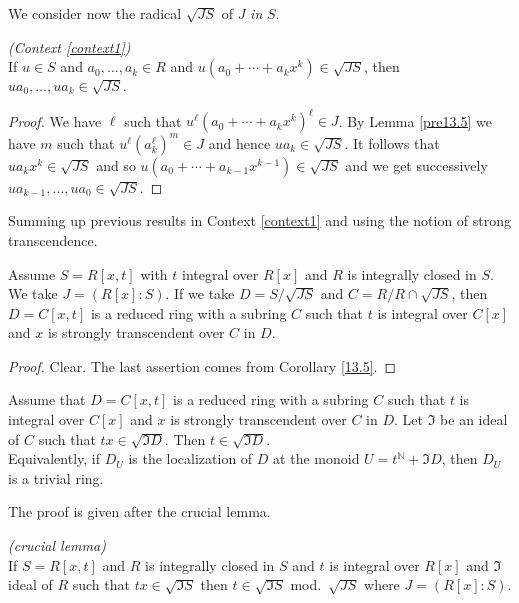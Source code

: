 \documentclass[11pt,a4paper,twoside]{article}
\newcommand{\gothic}{\mathfrak}
\newcommand{\fI}{{\gothic I}}
\begin{document}
 We consider now the radical $\sqrt {JS}$ of $J$ {\em in} $S$.

\begin{corollary}\label{13.5} \emph{(Context \ref{context1})}\\
If $u\in S$ and $a_0,\dots,a_k\in R$ and $u(a_0+ \cdots+a_kx^k)\in \sqrt{JS}$, then 
$ua_0,\dots,ua_k\in \sqrt{JS}.$
\end{corollary}

\begin{proof}
We have $\ell $ such that $u^\ell (a_0+ \cdots+a_kx^k)^\ell \in J$. By Lemma \ref{pre13.5} we have
$m$ such that $u^\ell (a_k^\ell )^m\in J$ and hence $ua_k\in \sqrt{JS}$. It follows that
$ua_kx^k \in \sqrt{JS}
$ and so $u(a_0+ \cdots+a_{k-1}x^{k-1})\in \sqrt{JS}
$ and we get
successively $ua_{k-1},\dots,ua_0\in \sqrt{JS}
$.
\end{proof}



\medskip Summing up previous results in Context  \ref{context1} 
and using the notion of strong transcendence.
\begin{proposition}\label{quotient}
Assume $S=R[x,t]$ with $t$ integral over $R[x]$ and $R$ is integrally closed in $S$.
We take $J=(R[x]:S)$. If we take $D = S/\sqrt{JS}
$ and $C=R/R\cap \sqrt{JS}
$, then
$D=C[x,t]$ is a reduced ring  with a subring $C$ such that $t$ is integral over
$C[x]$ and $x$ is strongly transcendent over $C$  in $D$.
\end{proposition}
%
\begin{proof}
Clear. The last assertion comes from Corollary \ref{13.5}.
\end{proof}
%


\begin{proposition} \label{lemDtrivial}
Assume  that $D=C[x,t]$ is a reduced ring  with a subring $C$ such that $t$ is integral over
$C[x]$ and $x$ is strongly transcendent over $C$ in $D$. Let ${\fI}$ be an ideal of $C$ such that $tx\in\sqrt{{\fI}D}$.
Then $t\in\sqrt{{\fI}D}$. \\
Equivalently, if $D_U$ is the localization of $D$ at the monoid $U=t^\mathbb{N}+{\fI}D$, then
$D_U$ is a trivial ring.
\end{proposition}

The proof is given after the crucial lemma.

\begin{proposition}\label{13.7} \emph{(crucial lemma)}\\
If $S = R[x,t]$ and $R$ is integrally closed in $S$ and $t$ is integral
over $R[x]$ and ${\fI}$ ideal of $R$ such that $tx\in\sqrt{{\fI}S}$
then $t\in\sqrt{{\fI}S}$ mod.\ $\sqrt{JS}
$ where $J = (R[x]:S)$.
\end{proposition}
\end{document}
